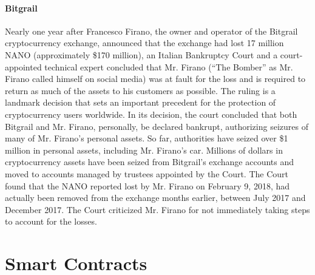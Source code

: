 \paragraph{Bitgrail} Nearly one year after Francesco Firano, the owner and operator of the Bitgrail cryptocurrency exchange, announced that the exchange had lost 17 million NANO (approximately \$170 million), an Italian Bankruptcy Court and a court-appointed technical expert concluded that Mr. Firano (``The Bomber'' as Mr. Firano called himself on social media) was at fault for the loss and is required to return as much of the assets to his customers as possible. The ruling is a landmark decision that sets an important precedent for the protection of cryptocurrency users worldwide. In its decision, the court concluded that both Bitgrail and Mr. Firano, personally, be declared bankrupt, authorizing seizures of many of Mr. Firano’s personal assets. So far, authorities have seized over \$1 million in personal assets, including Mr. Firano’s car. Millions of dollars in cryptocurrency assets have been seized from Bitgrail’s exchange accounts and moved to accounts managed by trustees appointed by the Court. The Court found that the NANO reported lost by Mr. Firano on February 9, 2018, had actually been removed from the exchange months earlier, between July 2017 and December 2017. The Court criticized Mr. Firano for not immediately taking steps to account for the losses.

\section{Smart Contracts}

